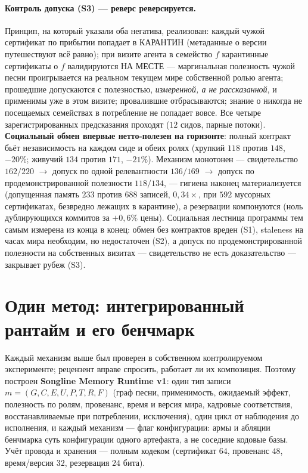\documentclass{article}
\begin{document}
\paragraph{Контроль допуска (S3) --- реверс реверсируется.} Принцип,
на который указали оба негатива, реализован: каждый чужой сертификат
по прибытии попадает в КАРАНТИН (метаданные о версии путешествуют
всё равно); при визите агента в семейство $f$ карантинные сертификаты
о $f$ валидируются НА МЕСТЕ --- маргинальная полезность чужой песни
проигрывается на реальном текущем мире собственной ролью агента;
прошедшие допускаются с полезностью, \emph{измеренной, а не
рассказанной}, и применимы уже в этом визите; провалившие
отбрасываются; знание о никогда не посещаемых семействах в
потребление не попадает вовсе. Все четыре зарегистрированных
предсказания проходят ($12$ сидов, парные потоки). \textbf{Социальный
обмен впервые нетто-полезен на горизонте}: полный контракт бьёт
независимость на каждом сиде и обеих ролях (хрупкий $118$ против
$148$, $-20\%$; живучий $134$ против $171$, $-21\%$). Механизм
монотонен --- свидетельство $162/220$ $\to$ допуск по одной
релевантности $136/169$ $\to$ допуск по продемонстрированной
полезности $118/134$, --- гигиена наконец материализуется (допущенная
память $233$ против $688$ записей, $0{,}34\times$, при $592$
мусорных сертификатах, безвредно лежащих в карантине), а резервации
компонуются (ноль дублирующихся коммитов за $+0{,}6\%$ цены).
Социальная лестница программы тем самым измерена из конца в конец:
обмен без контрактов вреден (S1), staleness на часах мира необходим,
но недостаточен (S2), а допуск по продемонстрированной полезности на
собственных визитах --- свидетельство не есть доказательство ---
закрывает рубеж (S3).


\section{Один метод: интегрированный рантайм и его бенчмарк}
\label{sec:integration}

Каждый механизм выше был проверен в собственном контролируемом
эксперименте; рецензент вправе спросить, работает ли их композиция.
Поэтому построен \textbf{Songline Memory Runtime v1}: один тип записи
$m = (G, C, E, U, P, T, R, F)$ (граф песни, применимость, ожидаемый
эффект, полезность по ролям, провенанс, время и версия мира,
кадровые соответствия, восстанавливаемые при потреблении,
исключения), один цикл от наблюдения до исполнения, и каждый механизм
--- флаг конфигурации: армы и абляции бенчмарка суть конфигурации
одного артефакта, а не соседние кодовые базы. Учёт провода и
хранения --- полным кодеком (сертификат $64$, провенанс $48$,
время/версия $32$, резервация $24$ бита).
\end{document}
